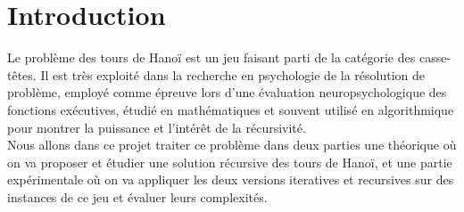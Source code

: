 \chapter{Introduction}
Le problème des tours de Hanoï est un jeu faisant parti de la catégorie des casse-têtes.
Il est très exploité dans la recherche en psychologie de la résolution de problème, employé comme épreuve lors d'une évaluation neuropsychologique des fonctions exécutives, étudié en mathématiques et souvent utilisé en algorithmique pour montrer la puissance et l'intérêt de la récursivité.\\
Nous allons dans ce projet traiter ce problème dans deux parties une théorique où on va proposer et étudier une solution récursive des tours de Hanoï, et une partie expérimentale où on va appliquer les deux versions iteratives et recursives sur des instances de ce jeu et évaluer leurs complexités.